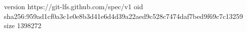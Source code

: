 version https://git-lfs.github.com/spec/v1
oid sha256:959ad1cf0a3c1e0e8b3d41e6d4d39a22aed9c528c7474daf7bed9f69c7c13259
size 1398272
